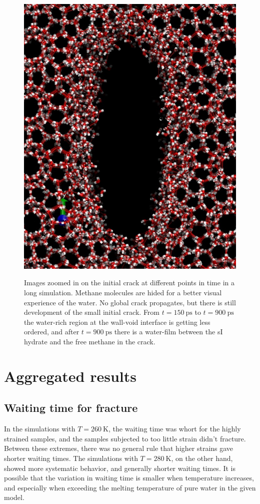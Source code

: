 \begin{figure}
\begin{minipage}[b]{0.24\linewidth}
{\includegraphics[width=\linewidth]{../pictures/snapshots_1045_280K/t_900000.pdf}}
\end{minipage}
\caption{Images zoomed in on the initial crack at different points in time in a long simulation. Methane molecules are hided for a better visual experience of the water. No global crack propagates, but there is still development of the small initial crack. From $t= \SI{150}{\pico\second}$ to $t=\SI{900}{\pico\second}$ the water-rich region at the wall-void interface is getting less ordered, and after $t=\SI{900}{\pico\second}$ there is a water-film between the sI hydrate and the free methane in the crack.}
\label{fig:crack_no_propagate_long_time_snapshots}
\end{figure}

\section{Aggregated results}

\subsection{Waiting time for fracture}
In the simulations with $T=\SI{260}{\kelvin}$, the waiting time was whort for the highly strained samples, and the samples subjected to too little strain didn't fracture. Between these extremes, there was no general rule that higher strains gave shorter waiting times. The simulations with $T=\SI{280}{\kelvin}$, on the other hand, showed more systematic behavior, and generally shorter waiting times. It is possible that the variation in waiting time is smaller when temperature increases, and especially when exceeding the melting temperature of pure water in the given model.

